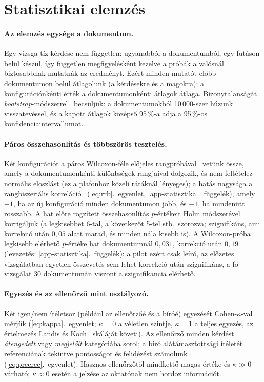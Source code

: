 \section{Statisztikai elemzés}
\label{sec:statisztika}

\paragraph{Az elemzés egysége a dokumentum.} Egy vizsga tíz kérdése nem független: ugyanabból a
dokumentumból, egy futáson belül készül, így független megfigyelésként kezelve a próbák a valósnál
biztosabbnak mutatnák az eredményt. Ezért minden mutatót előbb dokumentumon belül átlagolunk (a kérdésekre
és a magokra); a konfigurációnkénti érték a dokumentumonkénti átlagok átlaga. Bizonytalanságát
\emph{bootstrap}-módszerrel~\cite{efron1993} becsüljük: a dokumentumokból 10\,000-szer húzunk
visszatevéssel, és a kapott átlagok középső 95\,\%-a adja a 95\,\%-os konfidenciaintervallumot.

\paragraph{Páros összehasonlítás és többszörös tesztelés.} Két konfigurációt a páros Wilcoxon-féle
előjeles rangpróbával~\cite{wilcoxon1945} vetünk össze, amely a dokumentumonkénti különbségek rangjaival
dolgozik, és nem feltételez normális eloszlást (ez a plafonhoz közeli rátáknál lényeges); a hatás nagysága
a rangbiszeriális korreláció~\cite{kerby2014} (\ref{eq:rrb}.~egyenlet, \ref{app-statisztika}.~függelék),
amely $+1$, ha az új konfiguráció minden dokumentumon jobb, és $-1$, ha mindenütt rosszabb. A hat előre
rögzített összehasonlítás $p$-értékeit Holm módszerével~\cite{holm1979} korrigáljuk (a legkisebbet 6-tal,
a következőt 5-tel stb.\ szorozva; szignifikáns, ami korrekció után $0{,}05$ alatt marad, és minden nála
kisebb is). A Wilcoxon-próba legkisebb elérhető
$p$-értéke hat dokumentumnál $0{,}031$, korrekció után $0{,}19$ (levezetés: \ref{app-statisztika}.~függelék):
a pilot ezért csak leíró, az előzetes vizsgálatban egyetlen összevetés sem lehet korrekció után
szignifikáns, a fő vizsgálat 30 dokumentumán viszont a szignifikancia elérhető.

\paragraph{Egyezés és az ellenőrző mint osztályozó.} Két igen/nem ítéletsor (például az ellenőrzőé és a
bíróé) egyezését Cohen-$\kappa$-val~\cite{cohen1960kappa} mérjük (\ref{eq:kappa}.~egyenlet; $\kappa=0$ a
véletlen szintje, $\kappa=1$ a teljes egyezés, az értelmezés Landis és Koch~\cite{landis1977} skáláját
követi). Az ellenőrző minden kérdést \emph{átengedett} vagy \emph{megjelölt} kategóriába sorol; a bíró
alátámasztottsági ítéletét referenciának tekintve pontosságot és felidézést számolunk
(\ref{eq:precrec}.~egyenlet). Hasznos ellenőrzőtől mindkettő magas értéke és $\kappa\gg0$ várható;
$\kappa\approx0$ esetén a jelzése az oktatónak nem hordoz információt.

